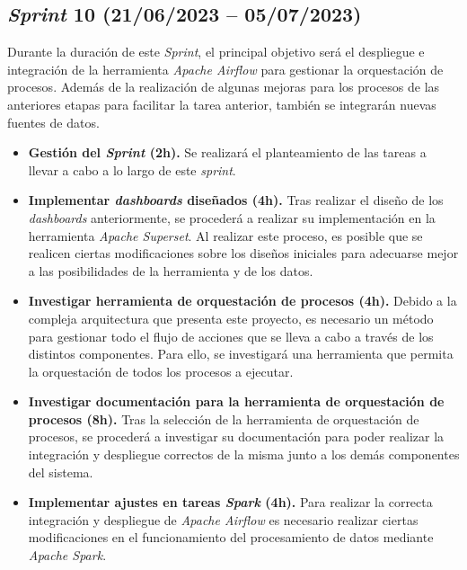 


\subsection{\textit{Sprint} 10 (21/06/2023 -- 05/07/2023)}

Durante la duración de este \textit{Sprint}, el principal objetivo será el despliegue e integración de la herramienta \textit{Apache Airflow} para gestionar la orquestación de procesos. Además de la realización de algunas mejoras para los procesos de las anteriores etapas para facilitar la tarea anterior, también se integrarán nuevas fuentes de datos.

\begin{itemize}

    \item \textbf{Gestión del \textit{Sprint} (2h).} Se realizará el planteamiento de las tareas a llevar a cabo a lo largo de este \textit{sprint}.

    \item \textbf{Implementar \textit{dashboards} diseñados (4h).} Tras realizar el diseño de los \textit{dashboards} anteriormente, se procederá a realizar su implementación en la herramienta \textit{Apache Superset}. Al realizar este proceso, es posible que se realicen ciertas modificaciones sobre los diseños iniciales para adecuarse mejor a las posibilidades de la herramienta y de los datos.

    \item \textbf{Investigar herramienta de orquestación de procesos (4h).} Debido a la compleja arquitectura que presenta este proyecto, es necesario un método para gestionar todo el flujo de acciones que se lleva a cabo a través de los distintos componentes. Para ello, se investigará una herramienta que permita la orquestación de todos los procesos a ejecutar.

    \item \textbf{Investigar documentación para la herramienta de orquestación de procesos (8h).} Tras la selección de la herramienta de orquestación de procesos, se procederá a investigar su documentación para poder realizar la integración y despliegue correctos de la misma junto a los demás componentes del sistema.
    
    \item \textbf{Implementar ajustes en tareas \textit{Spark} (4h).} Para realizar la correcta integración y despliegue de \textit{Apache Airflow} es necesario realizar ciertas modificaciones en el funcionamiento del procesamiento de datos mediante \textit{Apache Spark}.
    

\end{itemize}
